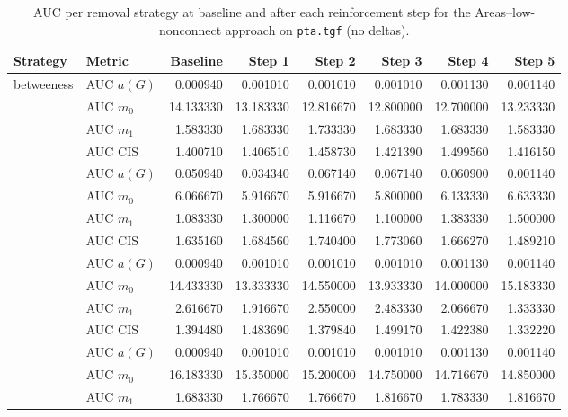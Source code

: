 \begin{table}[htbp]
  \centering
  \caption{AUC per removal strategy at baseline and after each reinforcement step for the Areas–low-nonconnect approach on \texttt{pta.tgf} (no deltas).}
  \label{tab:pta-areas_low_nonconnect-auc}
  \begin{tabular}{llrrrrrr}
    \toprule
    \textbf{Strategy} & \textbf{Metric} & \textbf{Baseline} & \textbf{Step 1} & \textbf{Step 2} & \textbf{Step 3} & \textbf{Step 4} & \textbf{Step 5} \\
    \midrule
    \multirow{4}{*}{betweeness} & AUC $a(G)$ & 0.000940 & 0.001010 & 0.001010 & 0.001010 & 0.001130 & 0.001140 \\
    & AUC $m_0$ & 14.133330 & 13.183330 & 12.816670 & 12.800000 & 12.700000 & 13.233330 \\
    & AUC $m_1$ & 1.583330 & 1.683330 & 1.733330 & 1.683330 & 1.683330 & 1.583330 \\
    & AUC CIS & 1.400710 & 1.406510 & 1.458730 & 1.421390 & 1.499560 & 1.416150 \\
    \addlinespace
    \multirow{4}{*}{closeness} & AUC $a(G)$ & 0.050940 & 0.034340 & 0.067140 & 0.067140 & 0.060900 & 0.001140 \\
    & AUC $m_0$ & 6.066670 & 5.916670 & 5.916670 & 5.800000 & 6.133330 & 6.633330 \\
    & AUC $m_1$ & 1.083330 & 1.300000 & 1.116670 & 1.100000 & 1.383330 & 1.500000 \\
    & AUC CIS & 1.635160 & 1.684560 & 1.740400 & 1.773060 & 1.666270 & 1.489210 \\
    \addlinespace
    \multirow{4}{*}{core influence} & AUC $a(G)$ & 0.000940 & 0.001010 & 0.001010 & 0.001010 & 0.001130 & 0.001140 \\
    & AUC $m_0$ & 14.433330 & 13.333330 & 14.550000 & 13.933330 & 14.000000 & 15.183330 \\
    & AUC $m_1$ & 2.616670 & 1.916670 & 2.550000 & 2.483330 & 2.066670 & 1.333330 \\
    & AUC CIS & 1.394480 & 1.483690 & 1.379840 & 1.499170 & 1.422380 & 1.332220 \\
    \addlinespace
    \multirow{4}{*}{degree} & AUC $a(G)$ & 0.000940 & 0.001010 & 0.001010 & 0.001010 & 0.001130 & 0.001140 \\
    & AUC $m_0$ & 16.183330 & 15.350000 & 15.200000 & 14.750000 & 14.716670 & 14.850000 \\
    & AUC $m_1$ & 1.683330 & 1.766670 & 1.766670 & 1.816670 & 1.783330 & 1.816670 \\

\end{tabular}
\end{table}
